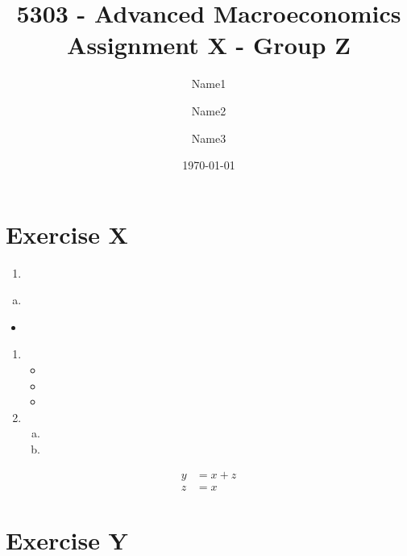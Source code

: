 \documentclass[a4paper,10pt,american]{article}
\title{5303 - Advanced Macroeconomics \\ Assignment X - Group Z}
\author{Name1 \\ \and Name2 \\ \and Name3}
\date{\today}
\theoremstyle{definition}
\begin{document}
\maketitle 

\section{Exercise X}

\begin{enumerate}
	\item 
\end{enumerate}

\begin{enumerate}[(a)]
	\item 
\end{enumerate}

\begin{itemize}
	\item
\end{itemize}

\begin{enumerate}
	\item
	\begin{itemize}
		\item 
		\item 
		\item
	\end{itemize}
	\item
	\begin{enumerate}[(a)]
		\item 
		\item
	\end{enumerate}
\end{enumerate}

\begin{align*}
	y &= x + z \\
	z &= x
\end{align*}

\section*{Exercise Y}
		
\end{document}
